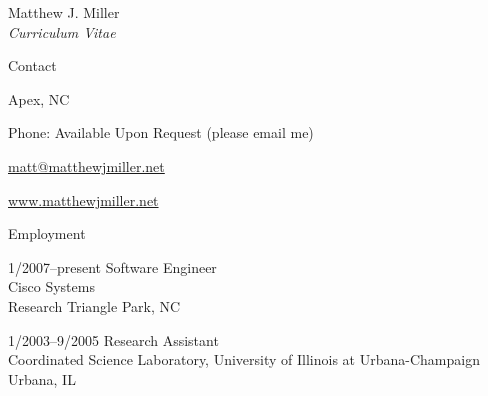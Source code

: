 \documentclass[10pt]{article}
\begin{document}


\newlength{\oldcvlabelwidth}
\renewcommand*{\cvbibname}{}

\begin{cv}{Matthew J. Miller\\{\large \itshape Curriculum Vitae}}

\begin{cvlist}{Contact}
    \item
    Apex, NC
    \item Phone: Available Upon Request (please email me)
    \item \href{mailto:matt@matthewjmiller.net}{matt@matthewjmiller.net}
    \item \href{http://www.matthewjmiller.net/}
    {www.matthewjmiller.net}
\end{cvlist}

\begin{cvlist}{Employment}
    \item[1/2007--present] Software Engineer\\
    Cisco Systems\\
    Research Triangle Park, NC
    \item[1/2003--9/2005] Research Assistant\\
    Coordinated Science Laboratory, University of Illinois at 
    Urbana-Champaign\\
    Urbana, IL
\end{cvlist}


\end{cv}
\end{document}
